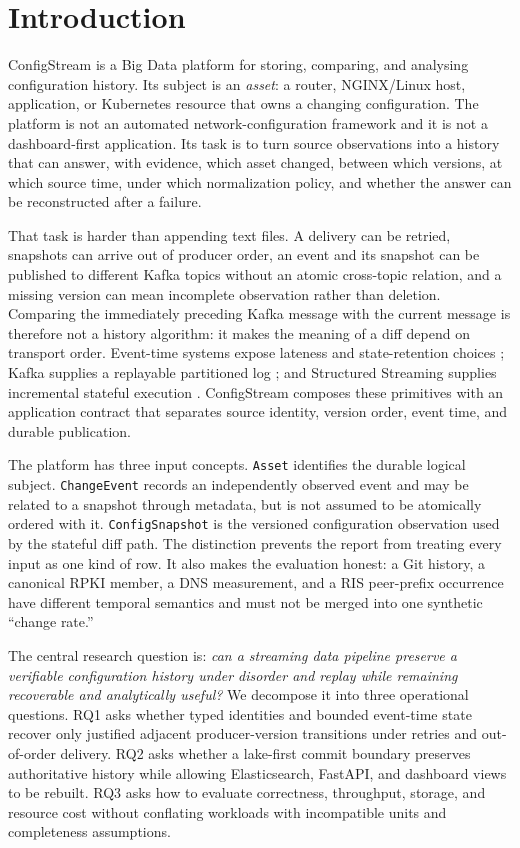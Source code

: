 \documentclass[a4paper,11pt]{article}
\begin{document}

\clearpage
\section{Introduction}
ConfigStream is a Big Data platform for storing, comparing, and analysing configuration history. Its subject is an \emph{asset}: a router, NGINX/Linux host, application, or Kubernetes resource that owns a changing configuration. The platform is not an automated network-configuration framework and it is not a dashboard-first application. Its task is to turn source observations into a history that can answer, with evidence, which asset changed, between which versions, at which source time, under which normalization policy, and whether the answer can be reconstructed after a failure.

That task is harder than appending text files. A delivery can be retried, snapshots can arrive out of producer order, an event and its snapshot can be published to different Kafka topics without an atomic cross-topic relation, and a missing version can mean incomplete observation rather than deletion. Comparing the immediately preceding Kafka message with the current message is therefore not a history algorithm: it makes the meaning of a diff depend on transport order. Event-time systems expose lateness and state-retention choices \citep{AkidauEtAl2015Dataflow}; Kafka supplies a replayable partitioned log \citep{KrepsNarkhedeRao2011Kafka}; and Structured Streaming supplies incremental stateful execution \citep{ArmbrustEtAl2018StructuredStreaming}. ConfigStream composes these primitives with an application contract that separates source identity, version order, event time, and durable publication.

The platform has three input concepts. \texttt{Asset} identifies the durable logical subject. \texttt{ChangeEvent} records an independently observed event and may be related to a snapshot through metadata, but is not assumed to be atomically ordered with it. \texttt{ConfigSnapshot} is the versioned configuration observation used by the stateful diff path. The distinction prevents the report from treating every input as one kind of row. It also makes the evaluation honest: a Git history, a canonical RPKI member, a DNS measurement, and a RIS peer-prefix occurrence have different temporal semantics and must not be merged into one synthetic ``change rate.''

The central research question is: \emph{can a streaming data pipeline preserve a verifiable configuration history under disorder and replay while remaining recoverable and analytically useful?} We decompose it into three operational questions. RQ1 asks whether typed identities and bounded event-time state recover only justified adjacent producer-version transitions under retries and out-of-order delivery. RQ2 asks whether a lake-first commit boundary preserves authoritative history while allowing Elasticsearch, FastAPI, and dashboard views to be rebuilt. RQ3 asks how to evaluate correctness, throughput, storage, and resource cost without conflating workloads with incompatible units and completeness assumptions.
\end{document}
